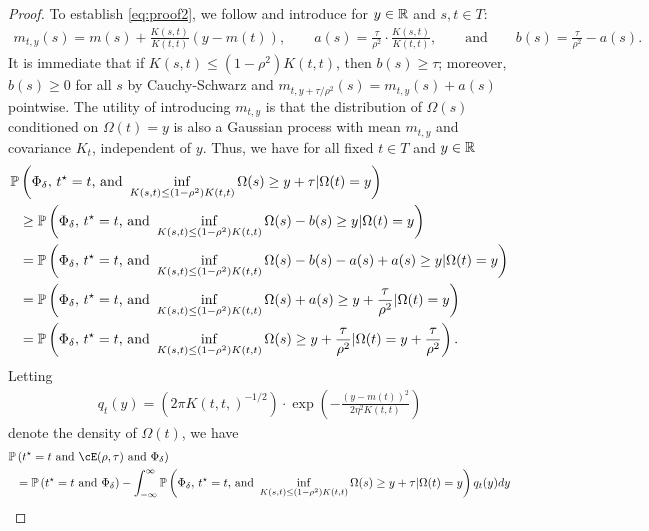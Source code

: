 \begin{proof}
    To establish \eqref{eq:proof2}, we follow \citet{block2024oracle} and introduce for $y \in \mathbb{R}$ and $s, t \in T$:
    \begin{align}\label{eq:proof3}
        m_{t,y}(s) = m(s) + \frac{K(s,t)}{K(t,t)}(y - m(t)), \qquad a(s) = \frac{\tau}{\rho^2} \cdot \frac{K(s,t)}{K(t,t)}, \qquad \text{and} \qquad b(s) = \frac{\tau}{\rho^2} - a(s).
    \end{align}
    It is immediate that if $K(s,t) \leq (1 - \rho^2) K(t,t)$, then $b(s) \geq \tau$; moreover, $b(s) \geq 0$ for all $s$ by Cauchy-Schwarz and $m_{t, y + \tau/\rho^2}(s) = m_{t,y}(s) + a(s)$ pointwise.  The utility of introducing $m_{t,y}$ is that the distribution of $\Omega(s)$ conditioned on $\Omega(t) = y$ is also a Gaussian process with mean $m_{t,y}$ and covariance $K_t$, independent of $y$.  Thus, we have for all fixed $t \in T$ and $y \in \mathbb{R}$
    \begin{align}
        \mathbb{P}&\left( \Phi_\delta, \, t^\star=t \text{, and } \inf_{K(s,t) \leq (1- \rho^2) K(t,t)} \Omega(s) \geq y + \tau | \Omega(t) = y \right) \\
        &\geq \mathbb{P}\left( \Phi_\delta, \, t^\star=t \text{, and } \inf_{K(s,t) \leq (1- \rho^2) K(t,t)} \Omega(s) - b(s) \geq y | \Omega(t) = y \right) \\
        &=  \mathbb{P}\left( \Phi_\delta, \, t^\star=t \text{, and } \inf_{K(s,t) \leq (1- \rho^2) K(t,t)} \Omega(s) - b(s) - a(s) + a(s) \geq y | \Omega(t) = y \right) \\
        &=  \mathbb{P}\left( \Phi_\delta, \, t^\star=t \text{, and } \inf_{K(s,t) \leq (1- \rho^2) K(t,t)} \Omega(s)  + a(s) \geq y + \frac{\tau}{\rho^2} | \Omega(t) = y \right) \\
        &= \mathbb{P}\left( \Phi_\delta, \, t^\star=t \text{, and } \inf_{K(s,t) \leq (1- \rho^2) K(t,t)} \Omega(s) \geq y + \frac{\tau}{\rho^2} | \Omega(t) = y + \frac{\tau}{\rho^2} \right).
    \end{align}
    Letting
    \begin{align}
        q_t(y) = (2 \pi K(t,t,)^{-1/2}) \cdot \exp\left( -\frac{(y - m(t))^2}{2 \eta^2 K(t,t)} \right)
    \end{align}
    denote the density of $\Omega(t)$, we have
    \begin{align}
        \pp&\left( \tstar = t \text{ and } \cE(\rho, \tau) \text{ and } \Phi_\delta \right) \\
        &= \pp\left( \tstar = t  \text{ and } \Phi_\delta \right)  - \int_{-\infty}^\infty \pp\left( \Phi_\delta, \, \tstar=t \text{, and } \inf_{K(s,t) \leq (1- \rho^2) K(t,t)} \Omega(s) \geq y + \tau | \Omega(t) = y \right)q_t(y) d y \\

\end{align}
\end{proof}
